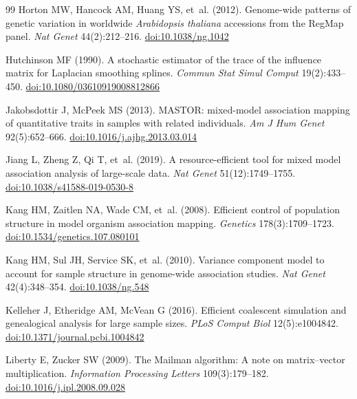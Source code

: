 \documentclass[11pt]{article}
\begin{document}
\begin{thebibliography}{99}
Horton MW, Hancock AM, Huang YS, et~al. (2012). Genome-wide patterns of
genetic variation in worldwide \emph{Arabidopsis thaliana} accessions
from the RegMap panel. \emph{Nat Genet} 44(2):212--216.
\href{https://doi.org/10.1038/ng.1042}{doi:10.1038/ng.1042}

Hutchinson MF (1990). A stochastic estimator of the trace of the
influence matrix for Laplacian smoothing splines. \emph{Commun Stat
Simul Comput} 19(2):433--450.
\href{https://doi.org/10.1080/03610919008812866}{doi:10.1080/03610919008812866}

Jakobsdottir J, McPeek MS (2013). MASTOR: mixed-model association
mapping of quantitative traits in samples with related individuals.
\emph{Am J Hum Genet} 92(5):652--666.
\href{https://doi.org/10.1016/j.ajhg.2013.03.014}{doi:10.1016/j.ajhg.2013.03.014}

Jiang L, Zheng Z, Qi T, et~al. (2019). A resource-efficient tool for
mixed model association analysis of large-scale data. \emph{Nat Genet}
51(12):1749--1755.
\href{https://doi.org/10.1038/s41588-019-0530-8}{doi:10.1038/s41588-019-0530-8}

Kang HM, Zaitlen NA, Wade CM, et~al. (2008). Efficient control of
population structure in model organism association mapping.
\emph{Genetics} 178(3):1709--1723.
\href{https://doi.org/10.1534/genetics.107.080101}{doi:10.1534/genetics.107.080101}

Kang HM, Sul JH, Service SK, et~al. (2010). Variance component model to
account for sample structure in genome-wide association studies.
\emph{Nat Genet} 42(4):348--354.
\href{https://doi.org/10.1038/ng.548}{doi:10.1038/ng.548}

Kelleher J, Etheridge AM, McVean G (2016). Efficient coalescent
simulation and genealogical analysis for large sample sizes.
\emph{PLoS Comput Biol} 12(5):e1004842.
\href{https://doi.org/10.1371/journal.pcbi.1004842}{doi:10.1371/journal.pcbi.1004842}

Liberty E, Zucker SW (2009). The Mailman algorithm: A note on
matrix--vector multiplication. \emph{Information Processing Letters}
109(3):179--182.
\href{https://doi.org/10.1016/j.ipl.2008.09.028}{doi:10.1016/j.ipl.2008.09.028}


\end{thebibliography}
\end{document}
